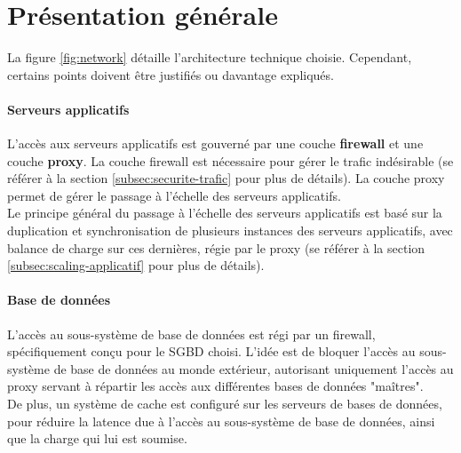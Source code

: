 
\usepackage{float}




\section{Présentation générale}

La figure \ref{fig:network} détaille l'architecture technique choisie.
Cependant, certains points doivent être justifiés ou davantage expliqués.

\paragraph{Serveurs applicatifs}

L'accès aux serveurs applicatifs est gouverné par une couche \textbf{firewall}
et une couche \textbf{proxy}. La couche firewall est nécessaire pour gérer le
trafic indésirable (se référer à la section
\ref{subsec:securite-trafic} pour plus de détails). La couche proxy
permet de gérer le passage à l'échelle des serveurs applicatifs. \\

Le principe général du passage à l'échelle des serveurs applicatifs est basé
sur la duplication et synchronisation de plusieurs instances des serveurs
applicatifs, avec balance de charge sur ces dernières, régie par le proxy (se
référer à la section \ref{subsec:scaling-applicatif} pour plus de détails).

\paragraph{Base de données}

L'accès au sous-système de base de données est régi par un firewall,
spécifiquement conçu pour le SGBD choisi. L'idée est de bloquer l'accès au
sous-système de base de données au monde extérieur, autorisant uniquement
l'accès au proxy servant à répartir les accès aux différentes bases de données
"maîtres". \\

De plus, un système de cache est configuré sur les serveurs de bases de données,
pour réduire la latence due à l'accès au sous-système de base de données, ainsi que
la charge qui lui est soumise.

